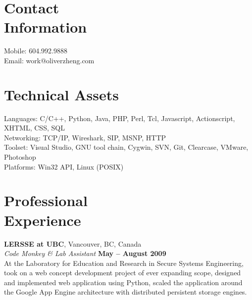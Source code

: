 \documentclass[margin,line]{resume}
\begin{document}
\begin{resume}

    \section{\mysidestyle Contact\\Information}

    Mobile: 604.992.9888
        \vspace{0mm}\\\vspace{0mm}%
    Email: work@oliverzheng.com

    \section{\mysidestyle Technical Assets}
    Languages: C/C++, Python, Java, PHP, Perl, Tcl, Javascript, Actionscript, XHTML, CSS, SQL
        \vspace{1mm}\\
    Networking: TCP/IP, Wireshark, SIP, MSNP, HTTP
        \vspace{1mm}\\
    Toolset: Visual Studio, GNU tool chain, Cygwin, SVN, Git, Clearcase, VMware, Photoshop
        \vspace{1mm}\\
    Platforms: Win32 API, Linux (POSIX)

    \section{\mysidestyle Professional\\Experience}

    \textbf{LERSSE at UBC}, Vancouver, BC, Canada \vspace{2mm}\\\vspace{1mm}%
    \textsl{Code Monkey \& Lab Assistant} \hfill \textbf{May -- August 2009}\\
    At the Laboratory for Education and Research in Secure Systems Engineering,
    took on a web concept development project of ever expanding scope,
    designed and implemented web application using Python,
    scaled the application around the Google App Engine architecture with distributed persistent storage engines.


\end{resume}
\end{document}
